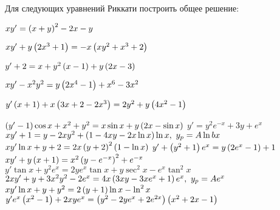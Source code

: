 
	Для следующих уравнений Риккати построить общее решение:
	\begin{enumtasks}

		\label{firstorder:to_linear_riccati}
		\item \( xy' = \left( x + y \right)^2 - 2x - y \) 																		%
		\item \( xy' + y \left( 2x^3 + 1 \right) = -x \left( xy^2 + x^3 + 2 \right) \) 												%
		\item \( y' + 2 = x + y^2 \left( x - 1 \right) + y \left( 2x - 3 \right) \) 													%
		\item \( xy' - x^2 y^2 = y \left( 2x^4 - 1 \right) + x^6 - 3x^2 \) 													%
		\item \( y' \left( x + 1 \right) + x \left( 3x + 2 - 2x^3 \right) = 2 y^2 + y \left( 4x^2 - 1 \right) \) 							%
		\item \( \left( y' - 1 \right) \cos{x} + x^2 + y^2 = x \sin{x} + y \left( 2x - \sin{x} \right) \) 							%
		\itemstar \( y' = y^2 e^{-x} + 3y + e^{x} \) 																	%
		\itemstar \( xy' + 1 = y - 2xy^2 + \left( 1 - 4xy - 2x \ln{x} \right) \ln{x}, ~ y_p = A \ln{bx} \)						%
		\itemstar \( xy' \ln{x} + y + 2 = 2x\left( y + 2 \right)^2 \left( 1 - \ln{x} \right) \)										%
		\itemstar \( y' + \left( y^2 + 1 \right) e^{x} = y \left( 2e^{x} - 1 \right) + 1 \) 											%
		\itemstar \( xy' + y \left( x + 1 \right) = x^2 \left( y - e^{-x} \right)^2 + e^{-x} \) 										%
		\itemstar \( y' \tan{x} + y^2 e^{x} = 2ye^{x} \tan{x} + y \sec^2{x} - e^{x} \tan^2{x} \)						%
		\itemstar \( 2xy' + y + 3 x^2 y^{2} - 2e^{x} = 4 x \left( 3xy - 3xe^{x} + 1 \right) e^{x}, ~ y_p = Ae^{x} \)			%
		\itemstar \( xy' \ln{x} + y + y^2 = 2 \left( y + 1 \right) \ln{x} - \ln^2{x} \) 										%
		\itemstar \( y' e^{x} \left( x^2 - 1 \right) + 2xye^{x} = \left( y^2 - 2ye^{x} + 2e^{2x} \right) \left( x^2 + 2 x - 1 \right) \)		%

	\end{enumtasks}
